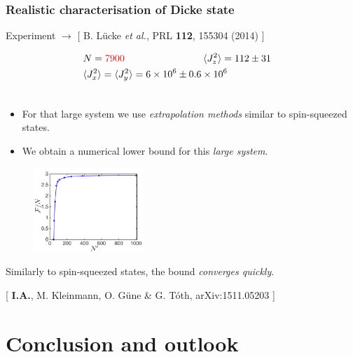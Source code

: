 \documentclass{beamer}
\newcommand{\expect}[1]{\ensuremath{\langle #1 \rangle}}
\newcommand{\citate}[1]{{\footnotesize{\color{gray}[ #1 ]}}

	}
\def\bea{\begin{eqnarray}}
\def\eea{\end{eqnarray}}
\def\nnnl{\nonumber\\}
\begin{document}
		\begin{frame}
			\frametitle{Realistic characterisation of Dicke state}
			{\small Experiment $\rightarrow$}
			\citate{B. L\"ucke {\it et al.}, PRL \textbf{112}, 155304 (2014)}

				\begin{block}{}
					\vspace{-1px}
					\bea
					 	&N ={\color{red} 7900} \hspace{80px} \expect{J_z^2}=112\pm 31 &\nnnl
						&\expect{J_x^2}=\expect{J_y^2}  =  6 \times 10^6 \pm 0.6\times 10^6 &\nnnl
						\nonumber
					\eea
				\end{block}

			\begin{itemize}
				\item For that large system we use \emph{\color{blue} extrapolation methods} similar to spin-squeezed states.
			\end{itemize}
		\end{frame}

		\begin{frame}
			\begin{itemize}
				\item We obtain a numerical lower bound for this \emph{\color{blue}large system}.
			\end{itemize}
			\vspace{-10px}
			\begin{figure}
				\includegraphics[height=120px]{img/asymptoticapproach-dicke.pdf}
			\end{figure}
			Similarly to spin-squeezed states, the bound \emph{\color{blue}converges quickly}.

			\citate{\textbf{I.A.}, M. Kleinmann, O. G\"une \& G. T\'oth, arXiv:1511.05203}
		\end{frame}

\section{Conclusion and outlook}
\end{document}
